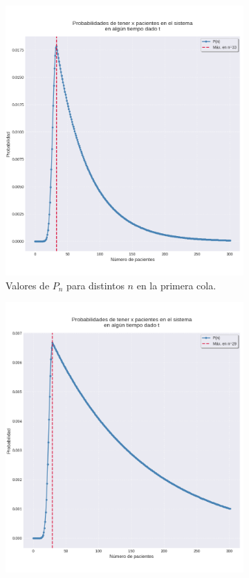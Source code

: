 \documentclass[10pt]{article}
\begin{document}
    \begin{figure}[!ht]
    	\centering
    	
    	\begin{subfigure}[c]{0.48\linewidth}
    		\centering
    		\includegraphics[width=\textwidth]{./images/pn-s1.png}
    		\caption{Valores de $P_{n}$ para distintos $n$ en la primera cola.}
    		\label{fig:pn_s1}
    	\end{subfigure}
    	\begin{subfigure}[c]{0.48\linewidth}
    		\centering
    		\includegraphics[width=\textwidth]{./images/pn-s2.png}

\end{subfigure}
\end{figure}
\end{document}
